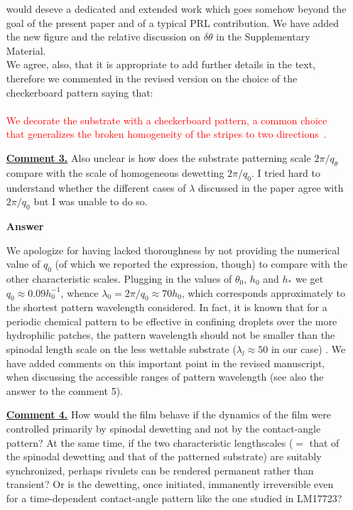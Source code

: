 \documentclass[12pt,english]{article}
\newcommand{\JH}[1]{\textcolor{blue}{JH: #1}}
\begin{document}
\begin{itemize}
{would deseve a dedicated and extended work which goes somehow beyond the goal of the present paper and of a typical PRL contribution.
We have added the new figure and the relative discussion on $\delta \theta$ in the
Supplementary Material.\\
We agree, also, that it is appropriate to add further details in the text, therefore we commented in the revised version on the choice of the checkerboard pattern saying that:\\
\\
\textcolor{red}{We decorate the substrate with a checkerboard pattern, a common choice that generalizes the broken homogeneity of the stripes to two 
directions~\cite{KarguptaLangmuir2003,Jalali2018,Nagayama2020,Das2020}.}

}

\item[ \textbf{\underline{Comment 3.}}]
{ 
Also unclear is how does the substrate patterning scale $2\pi/q_\theta$ compare with the scale of homogeneous dewetting $2\pi/q_0$.
I tried hard to understand whether the different cases of $\lambda$ discussed in the paper agree with $2\pi/q_0$ but I was unable to do so. 
}

\item[ \textbf{{Answer}}]
{
We apologize for having lacked thoroughness by not providing the numerical 
value of $q_0$ (of which we reported the expression, though) to compare with the 
other characteristic scales. Plugging in the values of $\theta_0$,
$h_0$ and $h_{\ast}$ we get $q_0 \approx 0.09 h_0^{-1}$, whence 
$\lambda_0 = 2\pi/q_0 \approx 70 h_0$, which corresponds approximately to the shortest pattern wavelength considered. 
In fact, it is known that for a periodic chemical pattern to be effective in 
confining droplets over the more hydrophilic patches, the pattern wavelength should 
not be smaller than the spinodal length scale on the less wettable substrate
($\lambda_l \approx 50$ in our case) \cite{KarguptaJCP2002,KarguptaLangmuir2000,Nisato1999,Karim1998}.
We have added comments on this important point in the revised manuscript, when discussing the accessible ranges of pattern wavelength (see also the answer to the comment 5).

}

\item[ \textbf{\underline{Comment 4.}}]
{  
How would the film behave if the dynamics of the film were controlled primarily by spinodal dewetting and not by the contact-angle pattern?
At the same time, if the two characteristic lengthscales ($=$ that of the spinodal dewetting and that of the patterned substrate) are suitably synchronized, perhaps rivulets can be rendered permanent rather than transient? Or is the dewetting, once initiated, immanently irreversible even for a
time-dependent contact-angle pattern like the one studied in LM17723?
}


\end{itemize}
\end{document}

